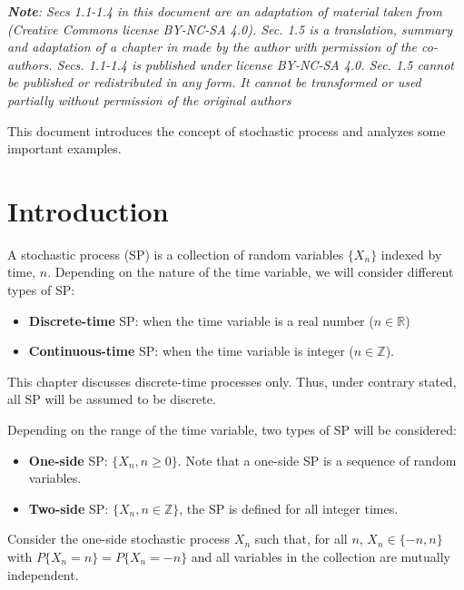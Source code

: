 
\textit{\textbf{Note}: Secs 1.1-1.4 in this document are an adaptation of material taken from \cite{MITcourse} (Creative Commons license BY-NC-SA 4.0). Sec. 1.5 is a translation, summary and adaptation of a chapter in \cite{ComDig2007} made by the author with permission of the co-authors. Secs. 1.1-1.4 is published under license BY-NC-SA 4.0. Sec. 1.5 cannot be published or redistributed in any form. It cannot be transformed or used partially without permission of the original authors}
\vspace{2cm}


This document introduces the concept of stochastic process and analyzes some important examples.

\section{Introduction}

A stochastic process (SP) is a collection of random variables $\{X_n\}$ indexed by time, $n$. Depending on the nature of the time variable, we will consider different types of SP:
\begin{itemize}
\item \textbf{Discrete-time} SP: when the time variable is a real number ($n \in \mathbb{R}$)
\item \textbf{Continuous-time} SP: when the time variable is integer ($n \in \mathbb{Z}$).
\end{itemize}

This chapter discusses discrete-time processes only. Thus, under contrary stated, all SP will be assumed to be discrete.

Depending on the range of the time variable, two types of SP will be considered:
\begin{itemize}
\item \textbf{One-side} SP: $\{X_n, n \ge 0\}$. Note that a one-side SP is a sequence of random variables.
\item \textbf{Two-side} SP: $\{X_n, n\in \mathbb{Z}\}$, the SP is defined for all integer times.
\end{itemize}

\begin{example}

Consider the one-side stochastic process $X_n$ such that, for all $n$, $X_n \in \{-n, n\}$ with $P\{X_n=n\}=P\{X_n=-n\}$ and all variables in the collection are mutually independent.

\end{example}

